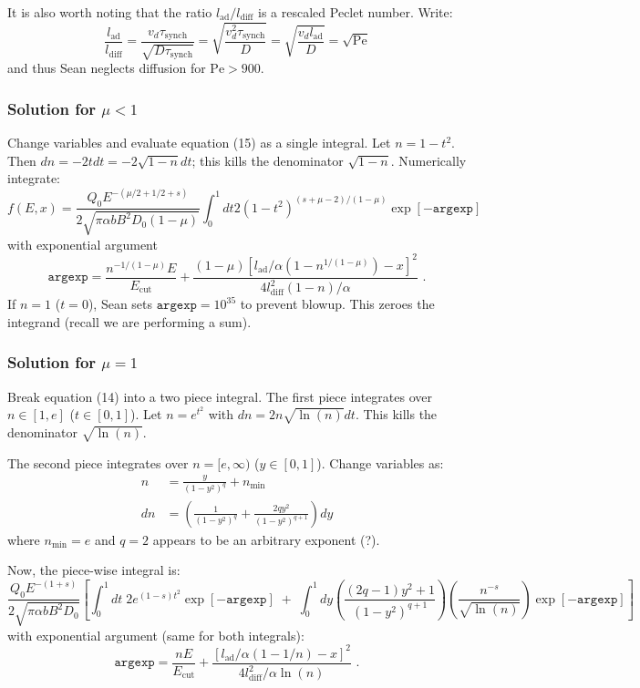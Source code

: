 \documentclass[10pt]{article}
\newcommand{\mt}{\mathrm}
\begin{document}
It is also worth noting that the ratio $l_{\mt{ad}} / l_{\mt{diff}}$ is a
rescaled Peclet number.  Write:
\[
    \frac{l_{\mt{ad}}}{l_{\mt{diff}}}
    = \frac{ v_d \tau_{\mt{synch}} }{ \sqrt{D \tau_{\mt{synch}}} }
    = \sqrt{ \frac{ v_d^2 \tau_{\mt{synch}} }{ D } }
    = \sqrt{ \frac{ v_d l_{\mt{ad}} }{ D } }
    = \sqrt{\mt{Pe}}
\]
and thus Sean neglects diffusion for $\mt{Pe} > 900$.


\subsubsection{Solution for \texorpdfstring{$\mu < 1$}{mu lt 1}}
Change variables and evaluate equation (15) as a single integral.
Let $n = 1 - t^2$. Then $dn = -2t dt = -2\sqrt{1-n}dt$;
this kills the denominator $\sqrt{1-n}$.  Numerically integrate:
\[
    f(E,x) = \frac{Q_0 E^{-(\mu/2 + 1/2 + s)}}
            {2 \sqrt{\pi \alpha b B^2 D_0 (1-\mu)}}
            \int_0^1 dt 2 (1-t^2)^{ (s+\mu-2) / (1-\mu) }
            \exp[ - \mathtt{argexp} ]
\]
with exponential argument
\[
    \mathtt{argexp} = \frac{n^{-1/(1-\mu)} E}{E_{\mt{cut}}}
    + \frac{(1 - \mu)
        \left[ l_{\mt{ad}}/\alpha \left(1 - n^{1/(1-\mu)}\right) - x \right]^2}
        {4 l_{\mt{diff}}^2 (1-n) / \alpha}
    \text{ .}
\]
If $n=1$ ($t=0$), Sean sets $\mathtt{argexp} = 10^{35}$ to prevent blowup.
This zeroes the integrand (recall we are performing a sum).


\subsubsection{Solution for \texorpdfstring{$\mu = 1$}{mu eq 1}}
Break equation (14) into a two piece integral.
The first piece integrates over $n\in [1,e]$ ($t\in[0,1]$).
Let $n = e^{t^2}$ with $dn = 2 n \sqrt{\ln(n)} dt$.
This kills the denominator $\sqrt{\ln(n)}$.

The second piece integrates over $n=[e,\infty)$ ($y\in[0,1]$).
Change variables as:
\begin{align*}
    n &= \frac{y}{(1-y^2)^q} + n_{\mt{min}} \\
    dn &= \left( \frac{1}{(1-y^2)^q} + \frac{2qy^2}{(1 - y^2)^{q+1}} \right) dy
\end{align*}
where $n_{\mt{min}} = e$ and $q = 2$ appears to be an arbitrary exponent (?).

Now, the piece-wise integral is:
\[
    \frac{Q_0 E^{-(1+s)}}
         { 2 \sqrt{ \pi \alpha b B^2 D_0 } }
    \left[
        \int_0^1 dt \; 2 e^{(1-s) t^2} \exp[ - \mathtt{argexp} ]
        \; + \;
        \int_0^1 dy \left(\frac{(2q-1) y^2 + 1}{(1 - y^2)^{q+1}}\right)
                    \left(\frac{n^{-s}}{ \sqrt{\ln(n)} }\right)
                    \exp[ - \mathtt{argexp} ]
    \right]
\]
with exponential argument (same for both integrals):
\[
    \mathtt{argexp} = \frac{n E}{E_{\mt{cut}}}
        + \frac{ \left[ l_{\mt{ad}}/\alpha (1 - 1/n) - x \right]^2 }
        { 4 l_{\mt{diff}}^2 /\alpha \ln(n) }
    \text{ .}
\]
\end{document}
